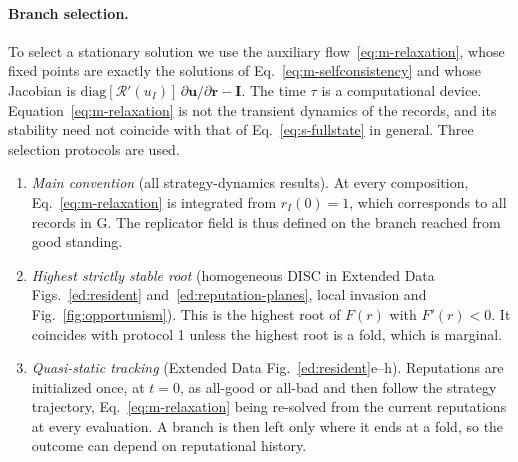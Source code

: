 \documentclass[fleqn,10pt]{wlscirep}
\newcommand{\Rmap}{\mathscr{R}}            %
\theoremstyle{plain}
\begin{document}
\paragraph{Branch selection.} To select a stationary solution we use the auxiliary flow~\eqref{eq:m-relaxation}, whose fixed points are exactly the solutions of Eq.~\eqref{eq:m-selfconsistency} and whose Jacobian is $\mathrm{diag}[\Rmap'(u_I)]\,\partial\bm u/\partial\bm r-\mathbf I$. The time $\tau$ is a computational device. Equation~\eqref{eq:m-relaxation} is not the transient dynamics of the records, and its stability need not coincide with that of Eq.~\eqref{eq:s-fullstate} in general. Three selection protocols are used.
\begin{enumerate}
\item \textit{Main convention} (all strategy-dynamics results). At every composition, Eq.~\eqref{eq:m-relaxation} is integrated from $r_I(0)=1$, which corresponds to all records in G. The replicator field is thus defined on the branch reached from good standing.
\item \textit{Highest strictly stable root} (homogeneous DISC in Extended Data Figs.~\ref{ed:resident} and~\ref{ed:reputation-planes}, local invasion and Fig.~\ref{fig:opportunism}). This is the highest root of $F(r)$ with $F'(r)<0$. It coincides with protocol 1 unless the highest root is a fold, which is marginal.
\item \textit{Quasi-static tracking} (Extended Data Fig.~\ref{ed:resident}e--h). Reputations are initialized once, at $t=0$, as all-good or all-bad and then follow the strategy trajectory, Eq.~\eqref{eq:m-relaxation} being re-solved from the current reputations at every evaluation. A branch is then left only where it ends at a fold, so the outcome can depend on reputational history.
\end{enumerate}
\end{document}
